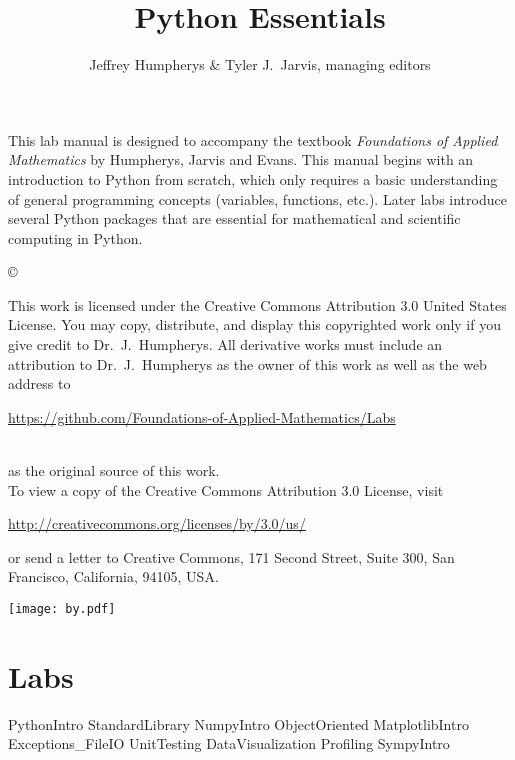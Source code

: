 \documentclass[opener-c,labs,black,nociteref]{HJnewsiambook}
\title{Python Essentials}
\author{Jeffrey Humpherys \& Tyler J.~Jarvis, managing editors}
\begin{document}

\thispagestyle{empty} %
\maketitle
\thispagestyle{empty}
\frontmatter



\begin{thepreface} %

This lab manual is designed to accompany the textbook \emph{Foundations of Applied Mathematics} by Humpherys, Jarvis and Evans.
This manual begins with an introduction to Python \cite{vanrossum2010python} from scratch, which only requires a basic understanding of general programming concepts (variables, functions, etc.).
Later labs introduce several Python packages that are essential for mathematical and scientific computing in Python.

\vfill
\copyright{This work is licensed under the Creative Commons Attribution 3.0 United States
License.  You may copy, distribute, and display this copyrighted work only if you give
credit to Dr.~J.~Humpherys. All derivative works must include an attribution to Dr.~J.~Humpherys as the owner of this work as well as the web address to
\\\centerline{\url{https://github.com/Foundations-of-Applied-Mathematics/Labs}}\\as the original source of this work.
\\To view a copy of the Creative Commons Attribution 3.0 License, visit
\\\centerline{\url{http://creativecommons.org/licenses/by/3.0/us/}} or send a letter to Creative Commons, 171 Second Street, Suite 300, San Francisco, California, 94105, USA.}

\vfill
\centering\texttt{[image: by.pdf]}
\vfill
\end{thepreface}

\setcounter{tocdepth}{1}
\tableofcontents

\mainmatter %

\part{Labs}
{PythonIntro}
{StandardLibrary}
{NumpyIntro}
{ObjectOriented}
{MatplotlibIntro}
{Exceptions_FileIO}
{UnitTesting}
{DataVisualization}
{Profiling}
{SympyIntro}
\end{document}
